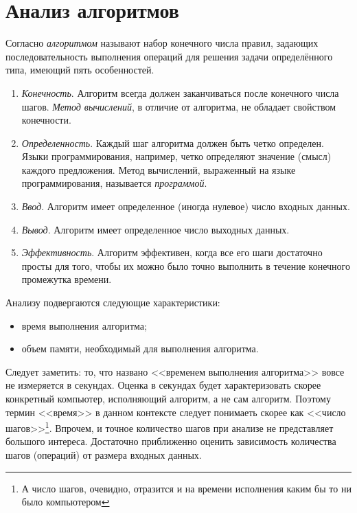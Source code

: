 \chapter{Анализ алгоритмов}
\label{ch:alg}

Согласно \cite{bib:knuth:artOfProgramming1} \emph{алгоритмом} называют набор конечного числа правил, задающих последовательность выполнения операций для решения задачи определённого типа, имеющий пять особенностей.
\begin{enumerate}
    \item \emph{Конечность}. Алгоритм всегда должен заканчиваться после конечного числа шагов. \emph{Метод вычислений}, в отличие от алгоритма, не обладает свойством конечности.
    
    \item \emph{Определенность}. Каждый шаг алгоритма должен быть четко определен. Языки программирования, например, четко определяют значение (смысл) каждого предложения. Метод вычислений, выраженный на языке программирования, называется \emph{программой}.
    
    \item \emph{Ввод}. Алгоритм имеет определенное (иногда нулевое) число входных данных.
    
    \item \emph{Вывод}. Алгоритм имеет определенное число выходных данных.
    
    \item \emph{Эффективность}. Алгоритм эффективен, когда все его шаги достаточно просты для того, чтобы их можно было точно выполнить в течение конечного промежутка времени.
\end{enumerate}

Анализу подвергаются следующие характеристики:
\begin{itemize}
    \item время выполнения алгоритма;
    \item объем памяти, необходимый для выполнения алгоритма.
\end{itemize}

Следует заметить: то, что названо <<временем выполнения алгоритма>> вовсе не измеряется в секундах. Оценка в секундах будет характеризовать скорее конкретный компьютер, исполняющий алгоритм, а не сам алгоритм. Поэтому термин <<время>> в данном контексте следует понимаеть скорее как <<число шагов>>\footnote{А число шагов, очевидно, отразится и на времени исполнения каким бы то ни было компьютером}. Впрочем, и точное количество шагов при анализе не представляет большого интереса. Достаточно приближенно оценить зависимость количества шагов (операций) от размера входных данных.

